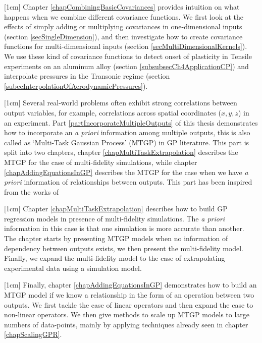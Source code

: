 [1cm]
Chapter \ref{chapCombiningBasicCovariances} provides intuition on what happens when we combine different covariance functions. We first look at the effects of simply adding or multiplying covariances in one-dimensional inputs (section \ref{secSingleDimension}), and then investigate how to create covariance functions for multi-dimensional inputs (section \ref{secMultiDimensionalKernels}). We use these kind of covariance functions to detect onset of plasticity in Tensile experiments on an aluminum alloy (section \ref{subsubsecCh4ApplicationCP}) and interpolate pressures in the Transonic regime (section \ref{subecInterpolationOfAerodynamicPressures}). 

[1cm]
Several real-world problems often exhibit strong correlations between output variables, for example, correlations across spatial coordinates ($x, y, z$) in an experiment. Part \ref{partIncorporateMultipleOutputs} of this thesis demonstrates how to incorporate an \textit{a priori} information among multiple outputs, this is also called as `Multi-Task Gaussian Process' (MTGP) in GP literature. This part is split into two chapters, chapter \ref{chapMultiTaskExtrapolation} describes the MTGP for the case of multi-fidelity simulations, while chapter \ref{chapAddingEquationsInGP} describes the MTGP for the case when we have \textit{a priori} information of relationships between outputs. This part has been inspired from the works of \cite{forrester2007multi, alvarez2011kernels, bonilla_multi-task_2008, Boyle05dependentgaussian, kennedy2000predicting, le2013multi, Constantinescu2013, journals/jmlr/AlvarezLL09, jidling2017linearly, ginsbourger2013invariances, sarkka2011linear}

[1cm]
Chapter \ref{chapMultiTaskExtrapolation} describes how to build GP regression models in presence of multi-fidelity simulations. The \textit{a priori} information in this case is that one simulation is more accurate than another. The chapter starts by presenting MTGP models when no information of dependency between outputs exists, we then present the multi-fidelity model. Finally, we expand the multi-fidelity model to the case of extrapolating experimental data using a simulation model. 

[1cm]
Finally, chapter \ref{chapAddingEquationsInGP} demonstrates how to build an MTGP model if we know a relationship in the form of an operation between two outputs. We first tackle the case of linear operators and then expand the case to non-linear operators. We then give methods to scale up MTGP models to large numbers of data-points, mainly by applying techniques already seen in chapter \ref{chapScalingGPR}. 

